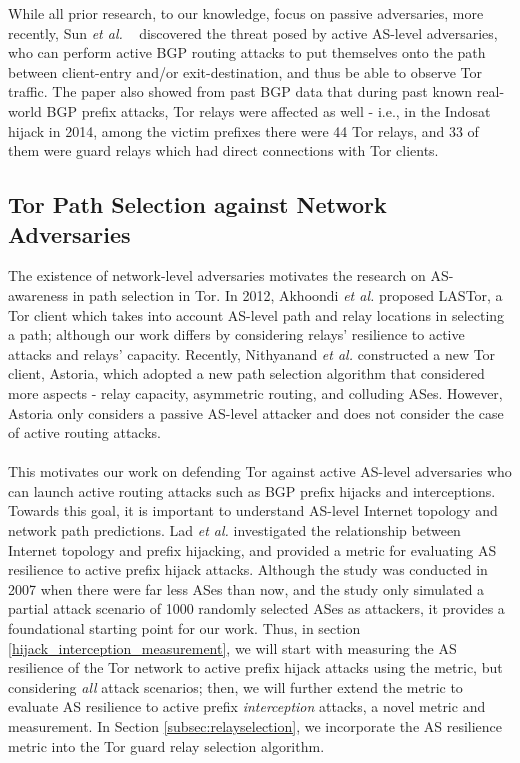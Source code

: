 While all prior research, to our knowledge, focus on passive adversaries, more recently, Sun \emph{et al.} ~\cite{sun2015raptor} discovered the threat posed by active AS-level adversaries, who can perform active BGP routing attacks to put themselves onto the path between client-entry and/or exit-destination, and thus be able to observe Tor traffic. The paper also showed from past BGP data that during past known real-world BGP prefix attacks, Tor relays were affected as well - i.e., in the Indosat hijack in 2014, among the victim prefixes there were 44 Tor relays, and 33 of them were guard relays which had direct connections with Tor clients. 

\subsection{Tor Path Selection against Network Adversaries}
The existence of network-level adversaries motivates the research on AS-awareness in path selection in Tor. In 2012, Akhoondi \emph{et al.} \cite{akhoondi2012lastor} proposed LASTor, a Tor client which takes into account AS-level path and relay locations in selecting a path; although our work differs by considering relays' resilience to active attacks and relays' capacity. Recently, Nithyanand \emph{et al.} \cite{starov2015measuring} constructed a new Tor client, Astoria, which adopted a new path selection algorithm that considered more aspects - relay capacity, asymmetric routing, and colluding ASes. However, Astoria only considers a passive AS-level attacker and does not consider the case of active routing attacks.\\
\\

This motivates our work on defending Tor against active AS-level adversaries who can launch active routing attacks such as BGP prefix hijacks and interceptions. Towards this goal, it is important to understand AS-level Internet topology and network path predictions. Lad \emph{et al.} \cite{lad2007understanding} investigated the relationship between Internet topology and prefix hijacking, and provided a metric for evaluating AS resilience to active prefix hijack attacks. Although the study was conducted in 2007 when there were far less ASes than now, and the study only simulated a partial attack scenario of 1000 randomly selected ASes as attackers, it provides a foundational starting point for our work. Thus, in section \ref{hijack_interception_measurement}, we will start with measuring the AS resilience of the Tor network to active prefix hijack attacks using the metric, but considering \emph{all} attack scenarios; then, we will further extend the metric to evaluate AS resilience to active prefix \emph{interception} attacks, a novel metric and measurement. In Section \ref{subsec:relayselection}, we incorporate the AS resilience metric into the Tor guard relay selection algorithm. 



